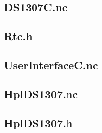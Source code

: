 \documentclass[12pt,a4paper,titlepage,oneside]{article}
\begin{document}
{\subsection{DS1307C.nc}


\subsection{Rtc.h}


\subsection{UserInterfaceC.nc}


\subsection{HplDS1307.nc}


\subsection{HplDS1307.h}


}%
\end{document}
